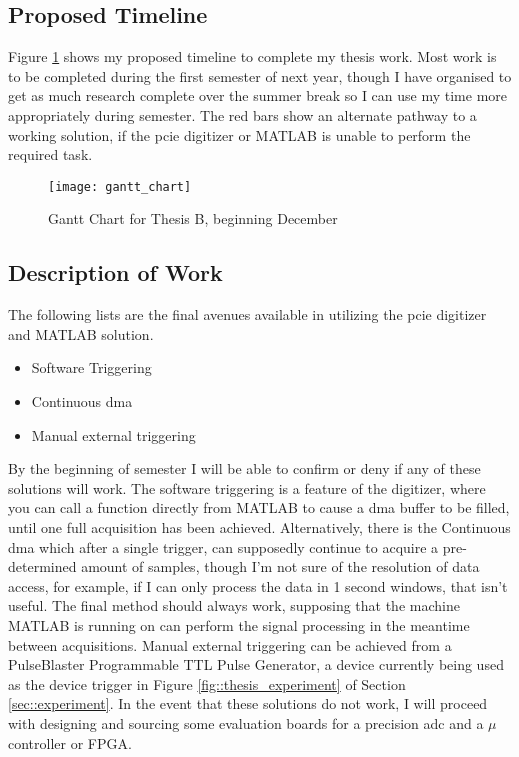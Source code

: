 \subsection{Proposed Timeline}
Figure \ref{fig::gantt_chart} shows my proposed timeline to complete my thesis work. Most work is to be completed during the first semester of next year, though I have organised to get as much research complete over the summer break so I can use my time more appropriately during semester. The red bars show an alternate pathway to a working solution, if the \gls{pcie} digitizer or MATLAB is unable to perform the required task.
\begin{figure}[htbp!]
	\centering
	\texttt{[image: gantt\_chart]}
	\caption{Gantt Chart for Thesis B, beginning December}
	\label{fig::gantt_chart}
\end{figure}

\subsection{Description of Work}

The following lists are the final avenues available in utilizing the \gls{pcie} digitizer and MATLAB solution.
\begin{itemize}
	\item Software Triggering
	\item Continuous \gls{dma}
	\item Manual external triggering
\end{itemize}
By the beginning of semester I will be able to confirm or deny if any of these solutions will work. The software triggering is a feature of the digitizer, where you can call a function directly from MATLAB to cause a \gls{dma} buffer to be filled, until one full acquisition has been achieved. Alternatively, there is the Continuous \gls{dma} which after a single trigger, can supposedly continue to acquire a pre-determined amount of samples, though I'm not sure of the resolution of data access, for example, if I can only process the data in 1 second windows, that isn't useful. The final method should always work, supposing that the machine MATLAB is running on can perform the signal processing in the meantime between acquisitions. Manual external triggering can be achieved from a PulseBlaster Programmable TTL Pulse Generator, a device currently being used as the device trigger in Figure \ref{fig::thesis_experiment} of Section \ref{sec::experiment}. In the event that these solutions do not work, I will proceed with designing and sourcing some evaluation boards for a precision \gls{adc} and a $\mu$controller or FPGA.

